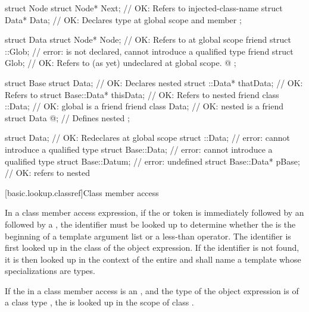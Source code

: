 \pnum
\begin{example}
\begin{codeblock}
struct Node {
  struct Node* Next;            // OK: Refers to injected-class-name 
  struct Data* Data;            // OK: Declares type  at global scope and member 
};

struct Data {
  struct Node* Node;            // OK: Refers to  at global scope
  friend struct ::Glob;         // error:  is not declared, cannot introduce a qualified type
  friend struct Glob;           // OK: Refers to (as yet) undeclared  at global scope.
  @\commentellip@
};

struct Base {
  struct Data;                  // OK: Declares nested 
  struct ::Data*     thatData;  // OK: Refers to 
  struct Base::Data* thisData;  // OK: Refers to nested 
  friend class ::Data;          // OK: global  is a friend
  friend class Data;            // OK: nested  is a friend
  struct Data { @\commentellip@ };    // Defines nested 
};

struct Data;                    // OK: Redeclares  at global scope
struct ::Data;                  // error: cannot introduce a qualified type
struct Base::Data;              // error: cannot introduce a qualified type
struct Base::Datum;             // error:  undefined
struct Base::Data* pBase;       // OK: refers to nested 
\end{codeblock}
\end{example}
%

[basic.lookup.classref]{Class member access}

\pnum
{}%
In a class member access expression, if the 
or \tcode{->} token is immediately followed by an 
followed by a \tcode{<}, the identifier must be looked up to determine
whether the \tcode{<} is the beginning of a template argument
list or a less-than operator. The identifier is first
looked up in the class of the object expression.
If the identifier is not found,
it is then looked up in the context of the entire
 and shall name a template
whose specializations are types.

\pnum
If the  in a class member
access is an , and the type of
the object expression is of a class type , the
 is looked up
in the scope of class .

